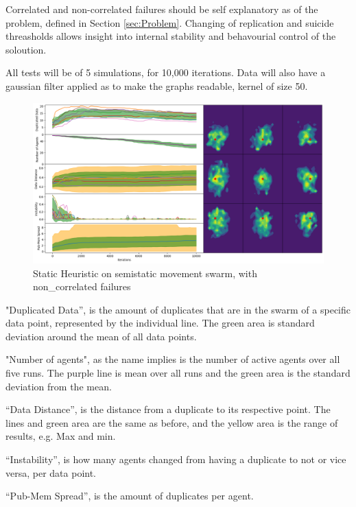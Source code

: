 \documentclass{UoYCSproject}
\begin{document}
Correlated and non-correlated failures should be self explanatory as of the problem, defined in Section \ref{sec:Problem}. 
Changing of replication and suicide threasholds allows insight into internal stability and behavourial control of the soloution.

All tests will be of 5 simulations, for 10,000 iterations. 
Data will also have a gaussian filter applied as to make the graphs readable, kernel of size 50. 

\begin{figure}[htb]
\label{fig:static_movement_non}
\begin{center}
\centering
\includegraphics[width=\linewidth]{"./Static_Heuristic/Static_Movement_non.png"}
\caption{Static Heuristic on semi\-static movement swarm, with non\_correlated failures}
\end{center}
\end{figure}

"Duplicated Data”, is the amount of duplicates that are in the swarm of a specific data point, represented by the individual line. 
The green area is standard deviation around the mean of all data points.

"Number of agents", as the name implies is the number of active agents over all five runs.
The purple line is mean over all runs and the green area is the standard deviation from the mean.

“Data Distance”, is the distance from a duplicate to its respective point. 
The lines and green area are the same as before, and the yellow area is the range of results, e.g. Max and min.

“Instability”, is how many agents changed from having a duplicate to not or vice versa, per data point.

“Pub-Mem Spread”, is the amount of duplicates per agent.
\end{document}
